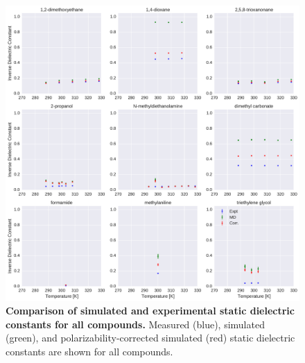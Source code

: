 \documentclass[aps,pre,twocolumn,nofootinbib,superscriptaddress,linenumbers]{revtex4-1}
\begin{document}
\begin{figure}[alldielectric]

\ContinuedFloat

\includegraphics[width=\textwidth]{./figures/dielectric_versus_temperature_part3.pdf}

\caption{{\bf Comparison of simulated and experimental static dielectric constants for all compounds.}
Measured (blue), simulated (green), and polarizability-corrected simulated (red) static dielectric constants are shown for all compounds.
}

\label{figure:AllDielectrics}

\end{figure}
\end{document}
